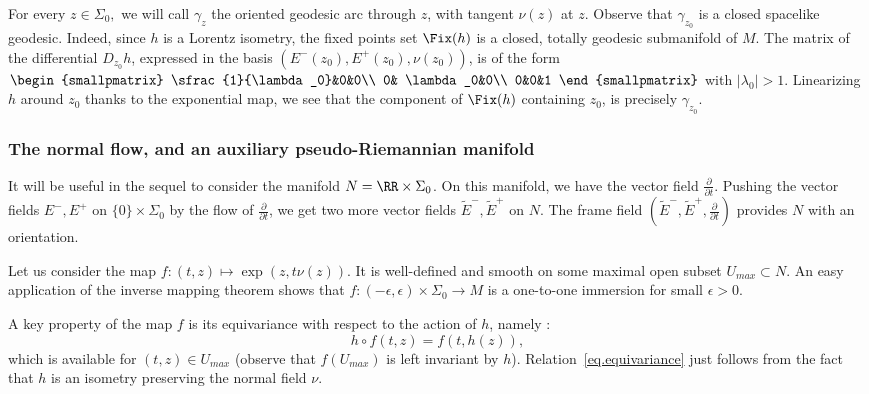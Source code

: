 For every $z \in \Sigma_0,$ we will call $\gamma_z$ the oriented geodesic arc through $z$, with tangent $\nu(z)$ at $z$. Observe that $\gamma_{z_0}$ is a closed spacelike geodesic. Indeed, since $h$ is a Lorentz isometry, the fixed points set $\Fix(h)$ is a closed, totally geodesic submanifold of $M$. The matrix of the differential $D_{z_0}h$, expressed in the basis $(E^-(z_0),E^+(z_0), \nu(z_0))$, is of the form $
\begin{smallpmatrix} \sfrac{1}{\lambda_0}&0&0\\ 0& \lambda_0&0\\ 0&0&1
\end{smallpmatrix}$ with $|\lambda_0|>1$. Linearizing $h$
around $z_0$ thanks to the exponential map, we see that the component of $\Fix(h)$ containing $z_0$, is precisely $\gamma_{z_0}$.



\subsubsection{The normal flow, and an auxiliary pseudo-Riemannian manifold}\label{sec.normalflow}
It will be useful in the sequel to consider the manifold $N=\RR \times
\Sigma_0$. On this manifold, we have the vector field $\frac{\partial}{\partial t}$. Pushing the vector fields $E^-,E^+$ on $\{ 0 \} \times \Sigma_0$ by the flow of $\frac{\partial}{\partial t}$, we get two more vector fields $\tilde{E}^-,\tilde{E}^+$ on $N$. The frame field $(\tilde{E}^-,\tilde{E}^+,\frac{\partial}{\partial t})$ provides $N$ with an orientation.


Let us consider the map $f: (t,z) \mapsto \exp(z,t\nu(z))$. It is well-defined and smooth on some maximal open subset $U_{max} \subset N$. An easy application of the inverse mapping theorem shows that $f: (-\epsilon,\epsilon) \times \Sigma_0 \to M$ is a one-to-one immersion for small $\epsilon >0$.



A key property of the map $f$ is its equivariance with respect to the action of $h$, namely :
\begin{equation}\label{eq.equivariance}
h \circ f(t,z) = f(t,h(z)),
\end{equation}
which is available for $(t,z) \in U_{max}$ (observe that $f(U_{max})$ is left invariant by $h$). Relation~\eqref{eq.equivariance} just follows from the fact that $h$ is an isometry preserving the normal field $\nu$.

